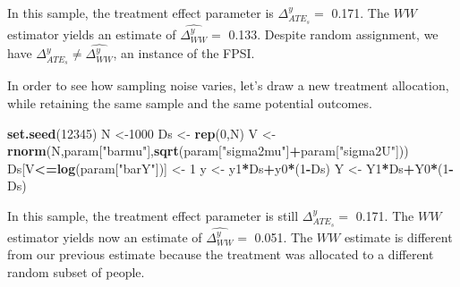 \documentclass[]{book}
\newenvironment{Shaded}{\begin{snugshade}}{\end{snugshade}}
\newcommand{\DecValTok}[1]{\textcolor[rgb]{0.00,0.00,0.81}{#1}}
\newcommand{\KeywordTok}[1]{\textcolor[rgb]{0.13,0.29,0.53}{\textbf{#1}}}
\newcommand{\NormalTok}[1]{#1}
\newcommand{\OperatorTok}[1]{\textcolor[rgb]{0.81,0.36,0.00}{\textbf{#1}}}
\newcommand{\StringTok}[1]{\textcolor[rgb]{0.31,0.60,0.02}{#1}}
\theoremstyle{definition}
\theoremstyle{definition}
\theoremstyle{definition}
\theoremstyle{remark}
\begin{document}
In this sample, the treatment effect parameter is \(\Delta^y_{ATE_s}=\) 0.171.
The \(WW\) estimator yields an estimate of \(\hat{\Delta^y_{WW}}=\) 0.133.
Despite random assignment, we have \(\Delta^y_{ATE_s}\neq\hat{\Delta^y_{WW}}\), an instance of the FPSI.

In order to see how sampling noise varies, let's draw a new treatment allocation, while retaining the same sample and the same potential outcomes.

\begin{Shaded}
\begin{Highlighting}[]
\KeywordTok{set.seed}\NormalTok{(}\DecValTok{12345}\NormalTok{)}
\NormalTok{N <-}\DecValTok{1000}
\NormalTok{Ds <-}\StringTok{ }\KeywordTok{rep}\NormalTok{(}\DecValTok{0}\NormalTok{,N)}
\NormalTok{V <-}\StringTok{ }\KeywordTok{rnorm}\NormalTok{(N,param[}\StringTok{"barmu"}\NormalTok{],}\KeywordTok{sqrt}\NormalTok{(param[}\StringTok{"sigma2mu"}\NormalTok{]}\OperatorTok{+}\NormalTok{param[}\StringTok{"sigma2U"}\NormalTok{]))}
\NormalTok{Ds[V}\OperatorTok{<=}\KeywordTok{log}\NormalTok{(param[}\StringTok{"barY"}\NormalTok{])] <-}\StringTok{ }\DecValTok{1} 
\NormalTok{y <-}\StringTok{ }\NormalTok{y1}\OperatorTok{*}\NormalTok{Ds}\OperatorTok{+}\NormalTok{y0}\OperatorTok{*}\NormalTok{(}\DecValTok{1}\OperatorTok{-}\NormalTok{Ds)}
\NormalTok{Y <-}\StringTok{ }\NormalTok{Y1}\OperatorTok{*}\NormalTok{Ds}\OperatorTok{+}\NormalTok{Y0}\OperatorTok{*}\NormalTok{(}\DecValTok{1}\OperatorTok{-}\NormalTok{Ds)}
\end{Highlighting}
\end{Shaded}

In this sample, the treatment effect parameter is still \(\Delta^y_{ATE_s}=\) 0.171.
The \(WW\) estimator yields now an estimate of \(\hat{\Delta^y_{WW}}=\) 0.051.
The \(WW\) estimate is different from our previous estimate because the treatment was allocated to a different random subset of people.
\end{document}
